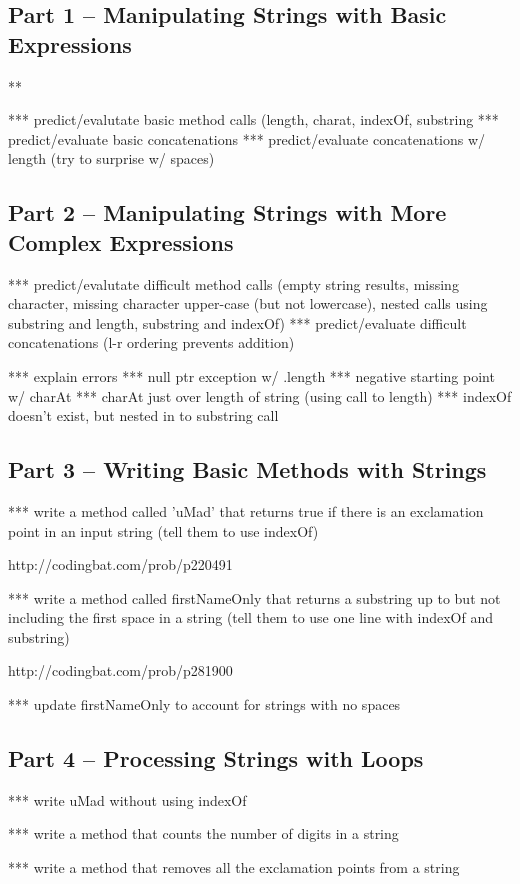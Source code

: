 \subsection{Part 1 -- Manipulating Strings with Basic Expressions}

\begin{eval}
\begin{sevalenum}
\item ***
\evalline
\end{sevalenum}
\end{eval}
*** predict/evalutate basic method calls (length, charat, indexOf, substring
*** predict/evaluate basic concatenations
*** predict/evaluate concatenations w/ length (try to surprise w/ spaces)



\subsection{Part 2 -- Manipulating Strings with More Complex Expressions}
*** predict/evalutate difficult method calls (empty string results, missing character, missing character upper-case (but not lowercase), nested calls using substring and length, substring and indexOf)
*** predict/evaluate difficult concatenations (l-r ordering prevents addition)

*** explain errors
	*** null ptr exception w/ .length
	*** negative starting point w/ charAt
	*** charAt just over length of string (using call to length)
	*** indexOf doesn't exist, but nested in to substring call


\initialbox

\subsection{Part 3 -- Writing Basic Methods with Strings}

*** write a method called 'uMad' that returns true if there is an exclamation point in an input string (tell them to use indexOf)

http://codingbat.com/prob/p220491

*** write a method called firstNameOnly that returns a substring up to but not including the first space in a string (tell them to use one line with indexOf and substring)

http://codingbat.com/prob/p281900

*** update firstNameOnly to account for strings with no spaces

\initialbox


\subsection{Part 4 -- Processing Strings with Loops}

*** write uMad without using indexOf

*** write a method that counts the number of digits in a string

*** write a method that removes all the exclamation points from a string

\initialbox

